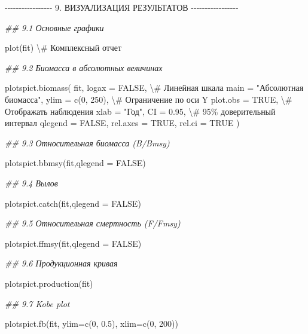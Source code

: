 \documentclass[
  letterpaper,
  DIV=11,
  numbers=noendperiod]{scrreprt}
\newenvironment{Shaded}{\begin{snugshade}}{\end{snugshade}}
\newcommand{\AttributeTok}[1]{\textcolor[rgb]{0.40,0.45,0.13}{#1}}
\newcommand{\CommentTok}[1]{\textcolor[rgb]{0.37,0.37,0.37}{#1}}
\newcommand{\ConstantTok}[1]{\textcolor[rgb]{0.56,0.35,0.01}{#1}}
\newcommand{\DecValTok}[1]{\textcolor[rgb]{0.68,0.00,0.00}{#1}}
\newcommand{\DocumentationTok}[1]{\textcolor[rgb]{0.37,0.37,0.37}{\textit{#1}}}
\newcommand{\FloatTok}[1]{\textcolor[rgb]{0.68,0.00,0.00}{#1}}
\newcommand{\FunctionTok}[1]{\textcolor[rgb]{0.28,0.35,0.67}{#1}}
\newcommand{\NormalTok}[1]{\textcolor[rgb]{0.00,0.23,0.31}{#1}}
\newcommand{\SpecialCharTok}[1]{\textcolor[rgb]{0.37,0.37,0.37}{#1}}
\begin{document}
\begin{Shaded}
\begin{Highlighting}[]
\SpecialCharTok{{-}{-}{-}{-}{-}{-}{-}{-}{-}{-}{-}{-}{-}{-}{-}{-}{-}} \FloatTok{9.}\NormalTok{ ВИЗУАЛИЗАЦИЯ РЕЗУЛЬТАТОВ }\SpecialCharTok{{-}{-}{-}{-}{-}{-}{-}{-}{-}{-}{-}{-}{-}{-}{-}{-}{-}}

\DocumentationTok{\#\# 9.1 Основные графики}

\FunctionTok{plot}\NormalTok{(fit) \textbackslash{}}\CommentTok{\# Комплексный отчет}

\DocumentationTok{\#\# 9.2 Биомасса в абсолютных величинах}

\FunctionTok{plotspict.biomass}\NormalTok{( fit, }\AttributeTok{logax =} \ConstantTok{FALSE}\NormalTok{, \textbackslash{}}\CommentTok{\# Линейная шкала main = "Абсолютная биомасса", ylim = c(0, 250), \textbackslash{}\# Ограничение по оси Y plot.obs = TRUE, \textbackslash{}\# Отображать наблюдения xlab = "Год", CI = 0.95, \textbackslash{}\# 95\% доверительный интервал qlegend = FALSE, rel.axes = TRUE, rel.ci = TRUE )}

\DocumentationTok{\#\# 9.3 Относительная биомасса (B/Bmsy)}

\FunctionTok{plotspict.bbmsy}\NormalTok{(fit,}\AttributeTok{qlegend =} \ConstantTok{FALSE}\NormalTok{)}

\DocumentationTok{\#\# 9.4 Вылов}

\FunctionTok{plotspict.catch}\NormalTok{(fit,}\AttributeTok{qlegend =} \ConstantTok{FALSE}\NormalTok{)}

\DocumentationTok{\#\# 9.5 Относительная смертность (F/Fmsy)}

\FunctionTok{plotspict.ffmsy}\NormalTok{(fit,}\AttributeTok{qlegend =} \ConstantTok{FALSE}\NormalTok{)}

\DocumentationTok{\#\# 9.6 Продукционная кривая}

\FunctionTok{plotspict.production}\NormalTok{(fit)}

\DocumentationTok{\#\# 9.7 Kobe plot}

\FunctionTok{plotspict.fb}\NormalTok{(fit, }\AttributeTok{ylim=}\FunctionTok{c}\NormalTok{(}\DecValTok{0}\NormalTok{, }\FloatTok{0.5}\NormalTok{), }\AttributeTok{xlim=}\FunctionTok{c}\NormalTok{(}\DecValTok{0}\NormalTok{, }\DecValTok{200}\NormalTok{))}
\end{Highlighting}
\end{Shaded}
\end{document}
